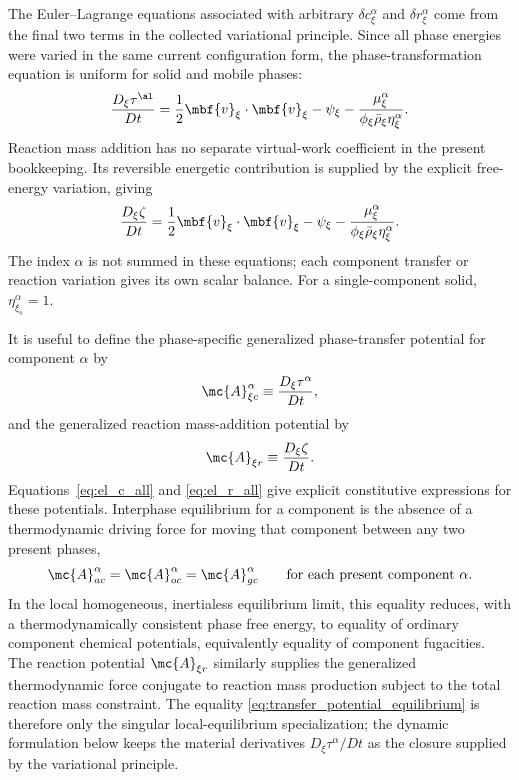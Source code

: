 The Euler--Lagrange equations associated with arbitrary $\delta c_\xi^\alpha$
and $\delta r_\xi^\alpha$ come from the final two terms in the collected
variational principle.  Since all phase energies were varied in the same current
configuration form, the phase-transformation equation is uniform for solid and
mobile phases:
\begin{equation}
  \frac{D_\xi\tau^\al}{Dt}
  = \frac{1}{2}\mbf{v}_{\xi}\cdot\mbf{v}_{\xi}
  - \psi_\xi
  - \frac{\mu^\alpha_{\xi}}{\phi_{\xi} \bar\rho_{\xi}\eta_{\xi}^\alpha}.
  \label{eq:el_c_all}
\end{equation}
Reaction mass addition has no separate virtual-work coefficient in the present
bookkeeping.  Its reversible energetic contribution is supplied by the explicit
free-energy variation, giving
\begin{equation}
  \frac{D_\xi\zeta}{Dt}
  = \frac{1}{2}\mbf{v}_{\xi}\cdot\mbf{v}_{\xi}
  - \psi_\xi
  - \frac{\mu^\alpha_{\xi}}{\phi_{\xi}\bar\rho_{\xi}\eta_{\xi}^\alpha}.
  \label{eq:el_r_all}
\end{equation}
The index $\alpha$ is not summed in these equations; each component transfer or
reaction variation gives its own scalar balance.  For a single-component solid,
$\eta_{\xi_s}^\alpha=1$.

It is useful to define the phase-specific generalized phase-transfer potential
for component $\alpha$ by
\begin{equation}
  \mc{A}_{\xi c}^\alpha
  \equiv \frac{D_\xi\tau^\alpha}{Dt},
  \label{eq:generalized_transfer_potential_def}
\end{equation}
and the generalized reaction mass-addition potential by
\begin{equation}
  \mc{A}_{\xi r} \equiv \frac{D_\xi\zeta}{Dt}.
  \label{eq:generalized_reaction_potential_def}
\end{equation}
Equations~\eqref{eq:el_c_all} and \eqref{eq:el_r_all} give explicit
constitutive expressions for these potentials.  Interphase equilibrium for a
component is the absence of a thermodynamic driving force for moving that
component between any two present phases,
\begin{equation}
  \mc{A}_{a c}^\alpha = \mc{A}_{o c}^\alpha = \mc{A}_{g c}^\alpha
  \qquad \text{for each present component }\alpha.
  \label{eq:transfer_potential_equilibrium}
\end{equation}
In the local homogeneous, inertialess equilibrium limit, this equality reduces,
with a thermodynamically consistent phase free energy, to equality of ordinary component
chemical potentials, equivalently equality of component fugacities.  The reaction
potential $\mc{A}_{\xi r}$ similarly supplies the generalized thermodynamic force
conjugate to reaction mass production subject to the total reaction mass
constraint.  The equality \eqref{eq:transfer_potential_equilibrium} is therefore
only the singular local-equilibrium specialization; the dynamic formulation below
keeps the material derivatives $D_\xi\tau^\alpha/Dt$ as the closure supplied by
the variational principle.

